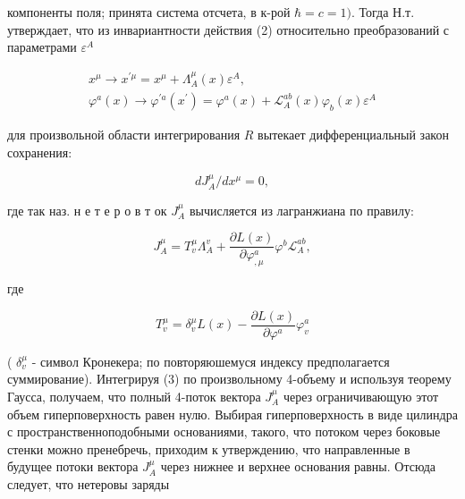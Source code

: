 \documentclass[10pt]{article}
\begin{document}
компоненты поля; принята система отсчета, в к-рой $\hbar=c=1)$. Тогда Н.т. утверждает, что из инвариантности действия (2) относительно преобразований с параметрами $\varepsilon^{A}$



\[

\begin{gathered}

x^{\mu} \rightarrow x^{\prime \mu}=x^{\mu}+\Lambda_{A}^{\mu}(x) \varepsilon^{A}, \\

\varphi^{a}(x) \rightarrow \varphi^{\prime a}\left(x^{\prime}\right)=\varphi^{a}(x)+\mathscr{L}_{A}^{a b}(x) \varphi_{b}(x) \varepsilon^{A}

\end{gathered}

\]



для произвольной области интегрирования $R$ вытекает дифференциальный закон сохранения:



\[

d J_{A}^{\mu} / d x^{\mu}=0,

\]



где так наз. н е т е р о в т ок $J_{A}^{\mu}$ вычисляется из лагранжиана по правилу:



\[

J_{A}^{\mu}=T_{v}^{\mu} \Lambda_{A}^{v}+\frac{\partial L(x)}{\partial \varphi_{, \mu}^{a}} \varphi^{b} \mathscr{L}_{A}^{a b},

\]



где



\[

T_{v}^{\mu}=\delta_{v}^{\mu} L(x)-\frac{\partial L(x)}{\partial \varphi^{a}} \varphi_{v}^{a}

\]



( $\delta_{v}^{\mu}$ - символ Кронекера; по повторяюшемуся индексу предполагается суммирование). Интегрируя (3) по произвольному 4-объему и используя теорему Гаусса, получаем, что полный 4-поток вектора $J_{A}^{\mu}$ через ограничивающую этот объем гиперповерхность равен нулю. Выбирая гиперповерхность в виде цилиндра с пространственноподобными основаниями, такого, что потоком через боковые стенки можно пренебречь, приходим к утверждению, что направленные в будущее потоки вектора $J_{A}^{\mu}$ через нижнее и верхнее основания равны. Отсюда следует, что нетеровы заряды
\end{document}
